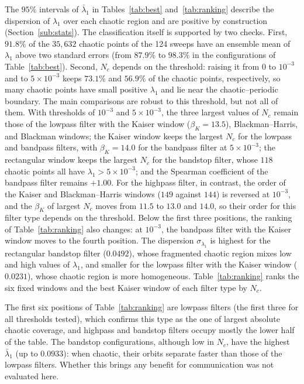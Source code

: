 \documentclass[journal]{IEEEtran}
\begin{document}
The $95\%$ intervals of $\bar\lambda_1$ in Tables~\ref{tab:best}
and~\ref{tab:ranking} describe the dispersion of $\lambda_1$ over each chaotic
region and are positive by construction (Section~\ref{sub:stats}). The
classification itself is supported by two checks. First, $91.8\%$ of the
$35{,}632$ chaotic points of the 124 sweeps have an ensemble mean of
$\lambda_1$ above two standard errors (from $87.9\%$ to $98.3\%$ in the
configurations of Table~\ref{tab:best}). Second, $N_c$ depends on the
threshold: raising it from 0 to $10^{-3}$ and to $5\times10^{-3}$ keeps
$73.1\%$ and $56.9\%$ of the chaotic points, respectively, so many chaotic
points have small positive $\lambda_1$ and lie near the chaotic--periodic
boundary. The main comparisons are robust to this threshold, but not all of
them. With thresholds of $10^{-3}$ and $5\times10^{-3}$, the three largest values
of $N_c$ remain those of the lowpass filter with the Kaiser window
($\beta_K=13.5$), Blackman--Harris, and Blackman windows; the Kaiser window keeps
the largest $N_c$ for the lowpass and bandpass filters, with $\beta_K=14.0$ for the
bandpass filter at $5\times10^{-3}$; the rectangular window keeps the largest $N_c$
for the bandstop filter, whose $118$ chaotic points all have
$\lambda_1>5\times10^{-3}$; and the Spearman coefficient of the bandpass filter
remains $+1.00$. For the highpass filter, in contrast, the order of the Kaiser and
Blackman--Harris windows ($149$ against $144$) is reversed at $10^{-3}$, and the
$\beta_K$ of largest $N_c$ moves from $11.5$ to $13.0$ and $14.0$, so their order for
this filter type depends on the threshold. Below the first three
positions, the ranking of Table~\ref{tab:ranking} also changes: at $10^{-3}$, the
bandpass filter with the Kaiser window moves to the fourth position. The dispersion $\sigma_{\lambda_1}$ is highest for the rectangular bandstop filter
($0.0492$), whose fragmented chaotic region mixes low and high values of
$\lambda_1$, and smaller for the lowpass filter with the Kaiser window
($0.0231$), whose chaotic region is more homogeneous.
Table~\ref{tab:ranking} ranks the six fixed windows and the best Kaiser window
of each filter type by $N_c$.

The first six positions of Table~\ref{tab:ranking} are lowpass filters (the first
three for all thresholds tested), which confirms this type as the one of largest absolute chaotic coverage, and
highpass and bandstop filters occupy mostly the lower half of the table. The
bandstop configurations, although low in $N_c$, have the highest
$\bar\lambda_1$ (up to $0.0933$): when chaotic, their orbits separate faster
than those of the lowpass filters. Whether this brings any benefit for
communication was not evaluated here.
\end{document}
